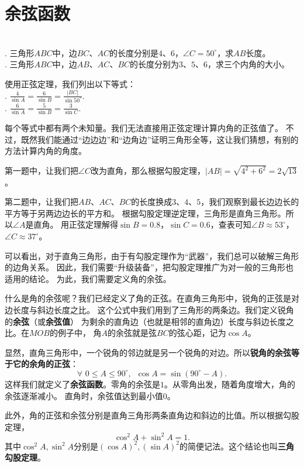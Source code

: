 \documentclass[12pt,UTF8,fontset=none]{ctexbook}
\begin{document}
\section{余弦函数}
\begin{ex}\label{ex:2-2-10}
    \mbox{} \\
    . 三角形$ABC$中，边$BC$、$AC$的长度分别是$4$、$6$，$\angle C = 50^\circ$，求$AB$长度。\\
    . 三角形$ABC$中，边$AB$、$AC$、$BC$的长度分别为$3$、$5$、$6$，求三个内角的大小。
\end{ex}
使用正弦定理，我们列出以下等式：\\
. $ \frac{4}{\sin A} = \frac{6}{\sin B} = \frac{|BC|}{\sin 50^\circ}.$ \\
. $ \frac{6}{\sin A} = \frac{5}{\sin B} = \frac{3}{\sin C}.$

每个等式中都有两个未知量。我们无法直接用正弦定理计算内角的正弦值了。
不过，既然我们能通过“边边边”和“边角边”证明三角形全等，这让我们猜想，有别的方法计算内角的角度。

第一题中，让我们把$\angle C$改为直角，那么根据勾股定理，$|AB| = \sqrt{4^2+6^2} = 2\sqrt{13}$。

第二题中，让我们把$AB$、$AC$、$BC$的长度换成$3$、$4$、$5$，我们观察到最长边边长的平方等于另两边边长的平方和。
根据勾股定理逆定理，三角形是直角三角形。所以$\angle A$是直角。
用正弦定理解得$\sin B = 0.8$，$\sin C = 0.6$，查表可知$\angle B \approx 53^\circ$，
$\angle C \approx 37^\circ$。

可以看出，对于直角三角形，由于有勾股定理作为“武器”，我们总可以破解三角形的边角关系。
因此，我们需要“升级装备”，把勾股定理推广为对一般的三角形也适用的结论。
为此，我们需要定义角的余弦。

什么是角的余弦呢？我们已经定义了角的正弦。在直角三角形中，锐角的正弦是对边长度与斜边长度之比。
这个公式中我们用到了三角形的两条边。我们定义锐角的\textbf{余弦}（或\textbf{余弦值}）
为剩余的直角边（也就是相邻的直角边）长度与斜边长度之比。在$MOB$的例子中，
角$A$的余弦就是弦$BC$的弦心距，记为$\cos A$。

显然，直角三角形中，一个锐角的邻边就是另一个锐角的对边。所以\textbf{锐角的余弦等于它的余角的正弦}：
$$ \forall \,\, 0 \leqslant A \leqslant 90^\circ, \,\,\, \cos A = \sin (90^\circ - A). $$
这样我们就定义了\textbf{余弦函数}。零角的余弦是$1$。从零角出发，随着角度增大，角的余弦逐渐减小。
直角时，余弦值达到最小值$0$。

此外，角的正弦和余弦分别是直角三角形两条直角边和斜边的比值。所以根据勾股定理，
$$ \cos^2 A + \sin^2 A = 1.$$
其中$\cos^2 A, \sin^2 A$分别是$(\cos A)^2, (\sin A)^2$的简便记法。这个结论也叫\textbf{三角勾股定理}。
\end{document}
